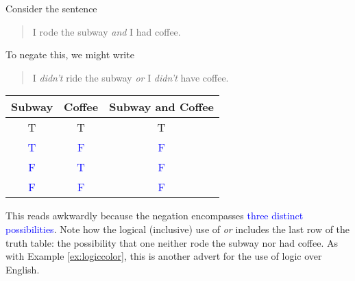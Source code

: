 \begin{example}{}{}
	Consider the sentence\par
	\begin{minipage}[t]{0.57\linewidth}\vspace{-1pt}
		\begin{quote}
			I rode the subway \emph{and} I had coffee.
		\end{quote}
		To negate this, we might write
		\begin{quote}
			I \emph{didn't} ride the subway \emph{or} I \emph{didn't} have coffee.
		\end{quote}
	\end{minipage}
	\hfill
	\begin{minipage}[t]{0.42\linewidth}\vspace{-20pt}
		\flushright	
		\begin{tabular}{c|c||c@{}}
			Subway&Coffee&Subway and Coffee\\\hline\hline
			T & T & T\\
			\textcolor{blue}{T} & \textcolor{blue}{F} & \textcolor{blue}{F}\\
			\textcolor{blue}{F} & \textcolor{blue}{T} & \textcolor{blue}{F}\\
			\textcolor{blue}{F} & \textcolor{blue}{F} &\textcolor{blue}{F}
		\end{tabular}
	\end{minipage}\bigbreak
	
	This reads awkwardly because the negation encompasses \textcolor{blue}{three distinct possibilities}. Note how the logical (inclusive) use of \emph{or} includes the last row of the truth table: the possibility that one neither rode the subway nor had coffee. As with Example \ref{ex:logiccolor}, this is another advert for the use of logic over English.
\end{example}


\goodbreak


